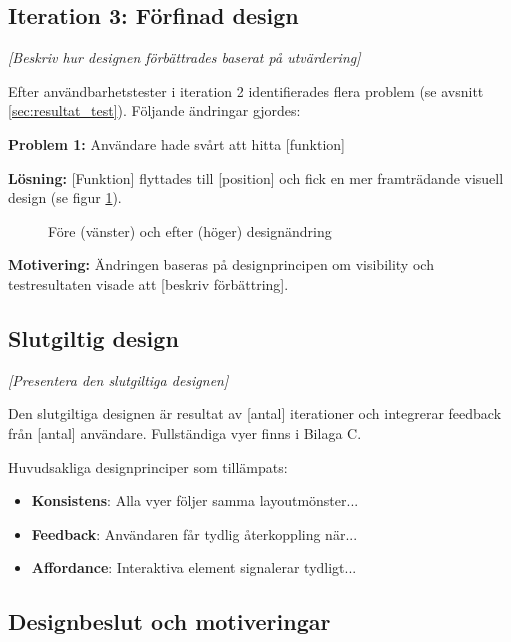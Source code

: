 

\subsection{Iteration 3: Förfinad design}

\textit{[Beskriv hur designen förbättrades baserat på utvärdering]}

Efter användbarhetstester i iteration 2 identifierades flera problem (se avsnitt \ref{sec:resultat_test}). Följande ändringar gjordes:

\textbf{Problem 1:} Användare hade svårt att hitta [funktion]

\textbf{Lösning:} [Funktion] flyttades till [position] och fick en mer framträdande visuell design (se figur \ref{fig:forbattring1}).

\begin{figure}[ht]
    \centering
    \caption{Före (vänster) och efter (höger) designändring}
    \label{fig:forbattring1}
\end{figure}

\textbf{Motivering:} Ändringen baseras på designprincipen om visibility \cite{sharp2019} och testresultaten visade att [beskriv förbättring].


\subsection{Slutgiltig design}

\textit{[Presentera den slutgiltiga designen]}

Den slutgiltiga designen är resultat av [antal] iterationer och integrerar feedback från [antal] användare. Fullständiga vyer finns i Bilaga C.

Huvudsakliga designprinciper som tillämpats:
\begin{itemize}
    \item \textbf{Konsistens}: Alla vyer följer samma layoutmönster...
    \item \textbf{Feedback}: Användaren får tydlig återkoppling när...
    \item \textbf{Affordance}: Interaktiva element signalerar tydligt...
\end{itemize}


\subsection{Designbeslut och motiveringar}


